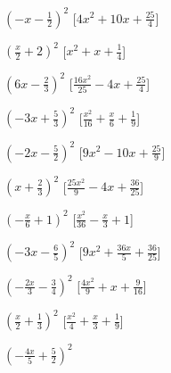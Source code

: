 \begin{esercizio}
\begin{multicols}{2}
\begin{enumeratea}
\item \(\left(- x - \frac{1}{2}\right)^{2}\)
  \hfill [\(4 x^{2} + 10 x + \frac{25}{4}\)]
\item \(\left(\frac{x}{2} + 2\right)^{2}\)
  \hfill [\(x^{2} + x + \frac{1}{4}\)]
\item \(\left(6 x - \frac{2}{3}\right)^{2}\)
  \hfill [\(\frac{16 x^{2}}{25} - 4 x + \frac{25}{4}\)]
\item \(\left(- 3 x + \frac{5}{3}\right)^{2}\)
  \hfill [\(\frac{x^{2}}{16} + \frac{x}{6} + \frac{1}{9}\)]
\item \(\left(- 2 x - \frac{5}{2}\right)^{2}\)
  \hfill [\(9 x^{2} - 10 x + \frac{25}{9}\)]
\item \(\left(x + \frac{2}{3}\right)^{2}\)
  \hfill [\(\frac{25 x^{2}}{9} - 4 x + \frac{36}{25}\)]
\item \(\left(- \frac{x}{6} + 1\right)^{2}\)
  \hfill [\(\frac{x^{2}}{36} - \frac{x}{3} + 1\)]
\item \(\left(- 3 x - \frac{6}{5}\right)^{2}\)
  \hfill [\(9 x^{2} + \frac{36 x}{5} + \frac{36}{25}\)]
\item \(\left(- \frac{2 x}{3} - \frac{3}{4}\right)^{2}\)
  \hfill [\(\frac{4 x^{2}}{9} + x + \frac{9}{16}\)]
\item \(\left(\frac{x}{2} + \frac{1}{3}\right)^{2}\)
  \hfill [\(\frac{x^{2}}{4} + \frac{x}{3} + \frac{1}{9}\)]
\item \(\left(- \frac{4 x}{5} + \frac{5}{2}\right)^{2}\)

\end{enumeratea}
\end{multicols}
\end{esercizio}

